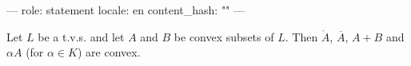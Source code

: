 ---
role: statement
locale: en
content_hash: ""
---

Let $L$ be a t.v.s. and let $A$ and $B$ be convex subsets of $L$. Then $\mathring{A}$, $\overline{A}$, $A + B$ and $\alpha A$ (for $\alpha \in K$) are convex.
